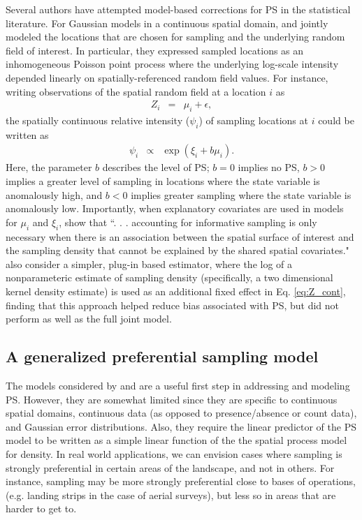 \documentclass[times,mee,doublespace,]{besauth2}
\begin{document}
Several authors have attempted model-based corrections for PS in the statistical literature. For Gaussian models in a continuous spatial domain, \citet{DiggleEtAl2010} and \citet{PatiEtAl2011} jointly modeled the locations that are chosen for sampling and the underlying random field of interest.  In particular, they expressed sampled locations as an inhomogeneous Poisson point process where the underlying log-scale intensity depended linearly on spatially-referenced random field values.  For instance, writing observations of the spatial random field at a location $i$ as
\begin{eqnarray}
   Z_i & = & \mu_i + \epsilon,
   \label{eq:Z_cont}
\end{eqnarray}
the spatially continuous relative intensity ($\psi_i$) of sampling locations at $i$ could be written as
\begin{eqnarray}
   \psi_i & \propto & \exp(\xi_i + b \mu_i).
   \label{eq:p_cont}
\end{eqnarray}
Here, the parameter $b$ describes the level of PS; $b=0$ implies no PS, $b>0$ implies a greater level of sampling in locations where the state variable is anomalously high, and $b<0$ implies greater sampling where the state variable is anomalously low.  Importantly, when explanatory covariates are used in models for $\mu_i$ and $\xi_i$, \citet{PatiEtAl2011} show that ``. . . accounting for informative sampling is only necessary when there
is an association between the spatial surface of interest and the sampling density that cannot be
explained by the shared spatial covariates."  \citet{PatiEtAl2011} also consider a simpler, plug-in based estimator, where the log of a nonparameteric estimate of sampling density (specifically, a two dimensional kernel density estimate) is used as an additional fixed effect in Eq. \ref{eq:Z_cont}, finding that this approach helped reduce bias associated with PS, but did not perform as well as the full joint model.

\subsection{A generalized preferential sampling model}

The models considered by \citet{DiggleEtAl2010} and \citet{PatiEtAl2011} are a useful first step in addressing and modeling PS.  However, they are somewhat limited since they are specific to continuous spatial domains, continuous data (as opposed to presence/absence or count data), and Gaussian error distributions.  Also, they require the linear predictor of the PS model to be written as a simple linear function of the the spatial process model for density.  In real world applications, we can envision cases where sampling is strongly preferential in certain areas of the landscape, and not in others.  For instance, sampling may be more strongly preferential close to bases of operations, (e.g. landing strips in the case of aerial surveys), but less so in areas that are harder to get to.
\end{document}
